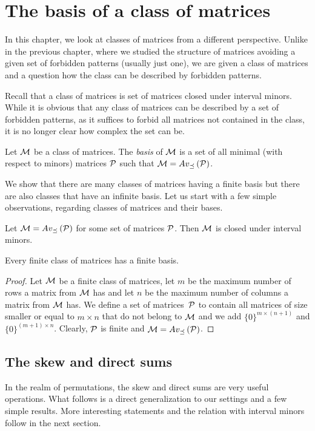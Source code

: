 \chapter{The basis of a class of matrices}
\label{chap:ops}
In this chapter, we look at classes of matrices from a different perspective. Unlike in the previous chapter, where we studied the structure of matrices avoiding a given set of forbidden patterns (usually just one), we are given a class of matrices and a question how the class can be described by forbidden patterns.

Recall that a class of matrices is set of matrices closed under interval minors. While it is obvious that any class of matrices can be described by a set of forbidden patterns, as it suffices to forbid all matrices not contained in the class, it is no longer clear how complex the set can be.

\begin{defn}
Let $\mathcal{M}$ be a class of matrices. The \emph{basis} of $\mathcal{M}$ is a set of all minimal (with respect to minors) matrices $\mathcal{P}$ such that $\mathcal{M}=Av_{\preceq}\left(\mathcal{P}\right)$.
\end{defn}

We show that there are many classes of matrices having a finite basis but there are also classes that have an infinite basis. Let us start with a few simple observations, regarding classes of matrices and their bases. 

\begin{obs}
Let $\mathcal{M}=Av_{\preceq}\left(\mathcal{P}\right)$ for some set of matrices $\mathcal{P}$. Then $\mathcal{M}$ is closed under interval minors.
\end{obs}

\begin{obs}
Every finite class of matrices has a finite basis.
\end{obs}
\begin{proof}
Let $\mathcal{M}$ be a finite class of matrices, let $m$ be the maximum number of rows a matrix from $\mathcal{M}$ has and let $n$ be the maximum number of columns a matrix from $\mathcal{M}$ has. We define a set of matrices~$\mathcal{P}$ to contain all matrices of size smaller or equal to $m\times n$ that do not belong to $\mathcal{M}$ and we add $\{0\}^{m\times(n+1)}$ and $\{0\}^{(m+1)\times n}$. Clearly, $\mathcal{P}$ is finite and $\mathcal{M}=Av_{\preceq}\left(\mathcal{P}\right)$.
\end{proof}

\section{The skew and direct sums}
In the realm of permutations, the skew and direct sums are very useful operations. What follows is a direct generalization to our settings and a few simple results. More interesting statements and the relation with interval minors follow in the next section.

